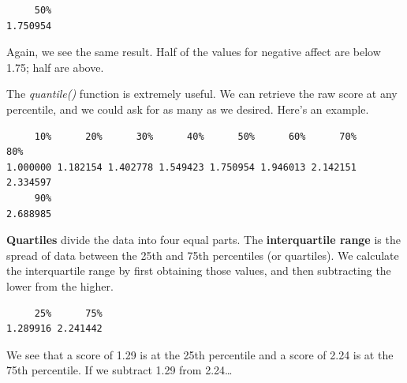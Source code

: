 \documentclass[
  11pt,
]{book}
\newenvironment{Shaded}{\begin{snugshade}}{\end{snugshade}}
\newcommand{\AttributeTok}[1]{\textcolor[rgb]{0.77,0.63,0.00}{#1}}
\newcommand{\FloatTok}[1]{\textcolor[rgb]{0.00,0.00,0.81}{#1}}
\newcommand{\FunctionTok}[1]{\textcolor[rgb]{0.00,0.00,0.00}{#1}}
\newcommand{\NormalTok}[1]{#1}
\newcommand{\SpecialCharTok}[1]{\textcolor[rgb]{0.00,0.00,0.00}{#1}}
\begin{document}
\begin{verbatim}
     50% 
1.750954 
\end{verbatim}

Again, we see the same result. Half of the values for negative affect are below 1.75; half are above.

The \emph{quantile()} function is extremely useful. We can retrieve the raw score at any percentile, and we could ask for as many as we desired. Here's an example.

\begin{Shaded}
\end{Shaded}

\begin{verbatim}
     10%      20%      30%      40%      50%      60%      70%      80% 
1.000000 1.182154 1.402778 1.549423 1.750954 1.946013 2.142151 2.334597 
     90% 
2.688985 
\end{verbatim}

\textbf{Quartiles} divide the data into four equal parts. The \textbf{interquartile range} is the spread of data between the 25th and 75th percentiles (or quartiles). We calculate the interquartile range by first obtaining those values, and then subtracting the lower from the higher.

\begin{Shaded}
\end{Shaded}

\begin{verbatim}
     25%      75% 
1.289916 2.241442 
\end{verbatim}

We see that a score of 1.29 is at the 25th percentile and a score of 2.24 is at the 75th percentile. If we subtract 1.29 from 2.24\ldots{}
\end{document}
